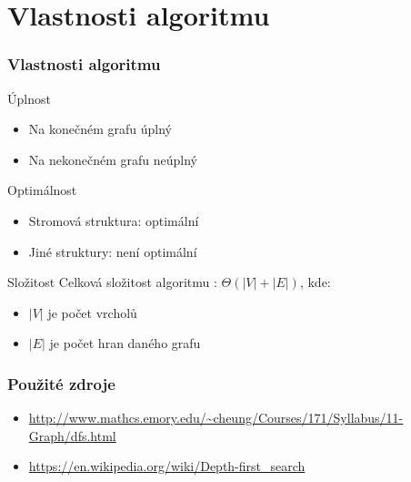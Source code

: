 \documentclass[10pt, hyperref={unicode}]{beamer}
\begin{document}
\section{Vlastnosti algoritmu}
\begin{frame}
	\frametitle{Vlastnosti algoritmu}
	\begin{block}{Úplnost}
			\begin{itemize}
				\item Na konečném grafu úplný
				\item Na nekonečném grafu neúplný
			\end{itemize}			    					
  		\end{block}
  	\begin{block}{Optimálnost}
			\begin{itemize}
				\item Stromová struktura: optimální
				\item Jiné struktury: není optimální
			\end{itemize}			    					
  		\end{block}
  	\begin{block}{Složitost}
  			Celková složitost algoritmu : $\Theta(|V| + |E|)$, kde:
			\begin{itemize}
			\item $|V|$ je počet vrcholů
			\item $|E|$ je počet hran daného grafu  	
			\end{itemize}				    					
  		\end{block}	 
\end{frame}

\begin{frame}
	\frametitle{Použité zdroje}
	\begin{itemize}
	\item \url{http://www.mathcs.emory.edu/~cheung/Courses/171/Syllabus/11-Graph/dfs.html}
	\item \url{https://en.wikipedia.org/wiki/Depth-first_search}
	\end{itemize}		
\end{frame}
\end{document}
